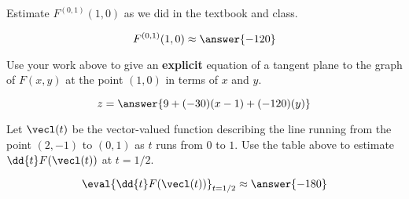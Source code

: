 \documentclass{ximera}
\begin{document}
\begin{problem}
Estimate $F^{(0,1)}(1,0)$ as we did in the textbook and class.
\begin{prompt}
\[
  F^{(0,1)}(1,0) \approx \answer{-120}
\]
\end{prompt}

\vfill

\end{problem}


\begin{problem}
  Use your work above to give an \textbf{explicit} equation of a
  tangent plane to the graph of $F(x,y)$ at the point $(1,0)$ in terms
  of $x$ and $y$.
\begin{prompt}
\[
z = \answer{9 + (-30)(x - 1) + (-120)(y)}
\]
\end{prompt}

\vfill

\end{problem}


\begin{problem}
  Let $\vecl(t)$ be the vector-valued function describing the line
  running from the point $(2,-1)$ to $(0,1)$ as $t$ runs from $0$ to
  $1$.  Use the table above to estimate $\dd{t}F(\vecl(t))$ at $t =
  1/2$.
  \begin{prompt}
  \[
  \eval{\dd{t} F(\vecl(t))}_{t=1/2} \approx \answer{-180}
  \]
  \end{prompt}

  \vfill
  
\end{problem}
\end{document}
